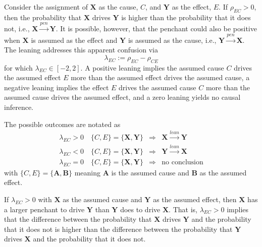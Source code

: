 Consider the assignment of $\mathbf{X}$ as the cause, $C$, and $\mathbf{Y}$ as the effect, $E$.  If $\rho_{EC}>0$, then the probability that $\mathbf{X}$ drives $\mathbf{Y}$ is higher than the probability that it does not, i.e., $\mathbf{X}\xrightarrow{pen}\mathbf{Y}$.  It is possible, however, that the penchant could also be positive when $\mathbf{X}$ is assumed as the effect and $\mathbf{Y}$ is assumed as the cause, i.e., $\mathbf{Y}\xrightarrow{pen}\mathbf{X}$.  The leaning addresses this apparent confusion via
\begin{equation}
\label{eq:leaning}
\lambda_{EC} := \rho_{EC} - \rho_{CE}
\end{equation}
for which $\lambda_{EC}\in\left[-2,2\right]$. A positive leaning implies the assumed cause $C$ drives the assumed effect $E$ more than the assumed effect drives the assumed cause, a negative leaning implies the effect $E$ drives the assumed cause $C$ more than the assumed cause drives the assumed effect, and a zero leaning yields no causal inference.  

The possible outcomes are notated as
\begin{eqnarray*}
\lambda_{EC}>0 \quad\{C,E\} = \{\mathbf{X},\mathbf{Y}\}&\Rightarrow&\mathbf{X}\xrightarrow{lean}\mathbf{Y}\\
\lambda_{EC}<0\quad\{C,E\} = \{\mathbf{X},\mathbf{Y}\}&\Rightarrow&\mathbf{Y}\xrightarrow{lean}\mathbf{X}\\
\lambda_{EC}=0\quad\{C,E\} = \{\mathbf{X},\mathbf{Y}\}&\Rightarrow& \mbox{no conclusion}
\end{eqnarray*}
with $\{C,E\} = \{\mathbf{A},\mathbf{B}\}$ meaning $\mathbf{A}$ is the assumed cause and $\mathbf{B}$ as the assumed effect.

If $\lambda_{EC}>0$ with $\mathbf{X}$ as the assumed cause and $\mathbf{Y}$ as the assumed effect, then $\mathbf{X}$ has a larger penchant to drive $\mathbf{Y}$ than $\mathbf{Y}$ does to drive $\mathbf{X}$.  That is, $\lambda_{EC}>0$ implies that the difference between the probability that $\mathbf{X}$ drives $\mathbf{Y}$ and the probability that it does not is higher than the difference between the probability that $\mathbf{Y}$ drives $\mathbf{X}$ and the probability that it does not.  

